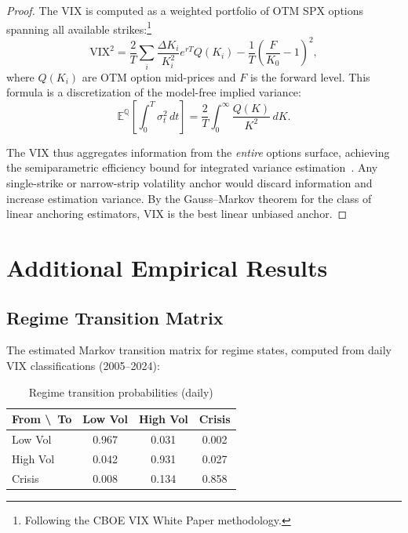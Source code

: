 \documentclass[11pt,a4paper]{article}
\theoremstyle{plain}
\theoremstyle{definition}
\theoremstyle{remark}
\newcommand{\E}{\mathbb{E}}
\newcommand{\riskneutral}{\mathbb{Q}}
\begin{document}
\begin{proof}
The VIX is computed as a weighted portfolio of OTM SPX options spanning all available strikes:\footnote{Following the CBOE VIX White Paper methodology.}
\begin{equation}\label{eq:vix_formula}
  \text{VIX}^2 = \frac{2}{T}\sum_i \frac{\Delta K_i}{K_i^2} e^{rT} Q(K_i) - \frac{1}{T}\left(\frac{F}{K_0} - 1\right)^2,
\end{equation}
where $Q(K_i)$ are OTM option mid-prices and $F$ is the forward level. This formula is a discretization of the model-free implied variance:
\begin{equation}\label{eq:mfiv}
  \E^{\riskneutral}\!\left[\int_0^T \sigma_t^2\,dt\right] = \frac{2}{T}\int_0^\infty \frac{Q(K)}{K^2}\,dK.
\end{equation}

The VIX thus aggregates information from the \emph{entire} options surface, achieving the semiparametric efficiency bound for integrated variance estimation~\citep{bollerslev2011expected}. Any single-strike or narrow-strip volatility anchor would discard information and increase estimation variance. By the Gauss--Markov theorem for the class of linear anchoring estimators, VIX is the best linear unbiased anchor.
\end{proof}

\section{Additional Empirical Results}

\subsection{Regime Transition Matrix}

The estimated Markov transition matrix for regime states, computed from daily VIX classifications (2005--2024):

\begin{table}[H]
\centering
\caption{Regime transition probabilities (daily)}
\label{tab:transition_matrix}
\begin{tabular}{l|ccc}
\toprule
From \textbackslash\ To & Low Vol & High Vol & Crisis \\
\midrule
Low Vol  & 0.967 & 0.031 & 0.002 \\
High Vol & 0.042 & 0.931 & 0.027 \\
Crisis   & 0.008 & 0.134 & 0.858 \\
\bottomrule
\end{tabular}
\end{table}
\end{document}

